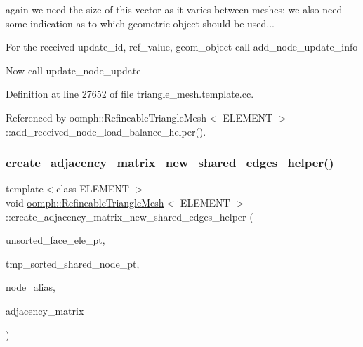 again we need the size of this vector as it varies between meshes; we also need some indication as to which geometric object should be used...

For the received update\+\_\+id, ref\+\_\+value, geom\+\_\+object call add\+\_\+node\+\_\+update\+\_\+info

Now call update\+\_\+node\+\_\+update 

Definition at line 27652 of file triangle\+\_\+mesh.\+template.\+cc.



Referenced by oomph\+::\+Refineable\+Triangle\+Mesh$<$ E\+L\+E\+M\+E\+N\+T $>$\+::add\+\_\+received\+\_\+node\+\_\+load\+\_\+balance\+\_\+helper().

\mbox{\label{classoomph_1_1RefineableTriangleMesh_a9a7862f1bcea07095590070bbc0305a7}} 
\subsubsection{\texorpdfstring{create\+\_\+adjacency\+\_\+matrix\+\_\+new\+\_\+shared\+\_\+edges\+\_\+helper()}{create\_adjacency\_matrix\_new\_shared\_edges\_helper()}}
{\footnotesize\ttfamily template$<$class E\+L\+E\+M\+E\+NT $>$ \\
void \hyperlink{classoomph_1_1RefineableTriangleMesh}{oomph\+::\+Refineable\+Triangle\+Mesh}$<$ E\+L\+E\+M\+E\+NT $>$\+::create\+\_\+adjacency\+\_\+matrix\+\_\+new\+\_\+shared\+\_\+edges\+\_\+helper (\begin{DoxyParamCaption}\item[{Vector$<$ Vector$<$ Finite\+Element $\ast$$>$ $>$ \&}]{unsorted\+\_\+face\+\_\+ele\+\_\+pt,  }\item[{Vector$<$ Vector$<$ Node $\ast$$>$ $>$ \&}]{tmp\+\_\+sorted\+\_\+shared\+\_\+node\+\_\+pt,  }\item[{std\+::map$<$ Node $\ast$, Vector$<$ Vector$<$ unsigned $>$ $>$ $>$ \&}]{node\+\_\+alias,  }\item[{Vector$<$ Vector$<$ Vector$<$ unsigned $>$ $>$ $>$ \&}]{adjacency\+\_\+matrix }\end{DoxyParamCaption})}




